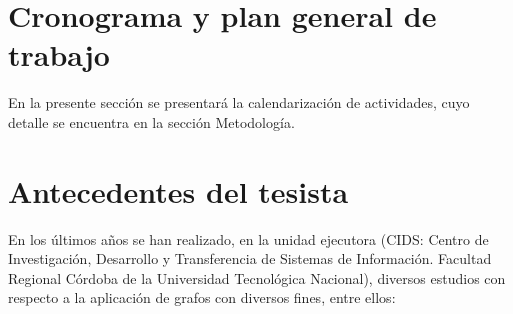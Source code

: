 \documentclass[
	11pt,oneside,a4paper,
	headsepline,footsepline,
	fleqn,
]{memoir}
\begin{document}
\section {Cronograma y plan general de trabajo}

En la presente sección se presentará la calendarización de actividades, cuyo detalle se encuentra en la sección Metodología.



\section{Antecedentes del tesista}

En los últimos años se han realizado, en la unidad ejecutora (CIDS: Centro de Investigación, Desarrollo y Transferencia de Sistemas de Información. Facultad Regional Córdoba de la Universidad Tecnológica Nacional), diversos estudios con respecto a la aplicación de grafos con diversos fines, entre ellos:
\end{document}
